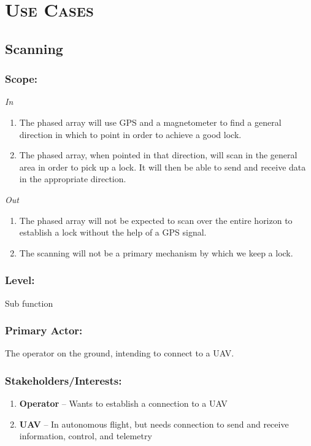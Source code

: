 \documentclass[ProductRequirements.tex]{subfiles}
\begin{document}
\bigskip

\section{\textsc{\Large Use Cases}}	

	\subsection{Scanning}
		\subsubsection*{Scope:}
			\textit{In}
			\begin{enumerate}
				\item The phased array will use GPS and a magnetometer to find a general direction in which to point in order to achieve a good lock.
				\item The phased array, when pointed in that direction, will scan in the general area in order to pick up a lock. It will then be able to send and receive data in the appropriate direction.
			\end{enumerate}
			\textit{Out}
			\begin{enumerate}
				\item The phased array will not be expected to scan over the entire horizon to establish a lock without the help of a GPS signal.
				\item The scanning will not be a primary mechanism by which we keep a lock.
			\end{enumerate}
		\subsubsection*{Level:}
			Sub function
		\subsubsection*{Primary Actor:}
			The operator on the ground, intending to connect to a UAV.
		\subsubsection*{Stakeholders/Interests:}
			\begin{enumerate}\itemsep1pt
				\item \textbf{Operator} -- Wants to establish a connection to a UAV
				\item \textbf{UAV} -- In autonomous flight, but needs connection to send and receive information, control, and telemetry
			\end{enumerate}
\end{document}
